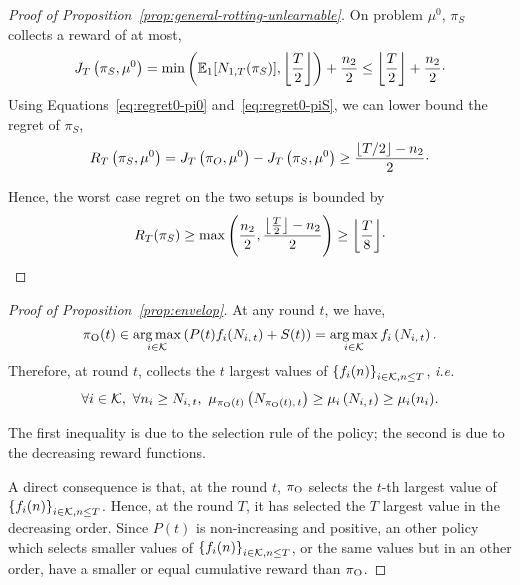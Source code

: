\begin{proof}[Proof of Proposition~\ref{prop:general-rotting-unlearnable}]
On problem $\mu^{0}$, $\pi_S$ collects a reward of at most,
\begin{equation}
\label{eq:regret0-piS}
    J_T\left(\pi_S, \mu^0\right) = \min\left(\mathbb{E}_1[N_{1,T}(\pi_S)],\left\lfloor\frac{T}{2}\right\rfloor\right) + \frac{n_2}{2} \leq \left\lfloor\frac{T}{2}\right\rfloor + \frac{n_2}{2}\cdot
\end{equation}
Using Equations~\ref{eq:regret0-pi0} and~\ref{eq:regret0-piS}, we can lower bound the regret of $\pi_S$, 
\[ R_T\left(\pi_S, \mu^0\right) = J_T\left(\pi_O, \mu^0\right) - J_T\left(\pi_S, \mu^0\right) \geq  \frac{\left\lfloor T/2\right\rfloor - n_2}{2}\cdot \]

Hence, the worst case regret on the two setups is bounded by 
\[R_T(\pi_S) \geq \max\left(\frac{n_2}{2}, \frac{\left\lfloor\frac{T}{2}\right\rfloor - n_2}{2}\right) \geq \left\lfloor\frac{T}{8}\right\rfloor\!\cdot \]
\end{proof}

\begin{proof}[Proof of Proposition~\ref{prop:envelop}]
At any round $t$, we have,
\[
\pi_{\rm O}(t) \in \operatorname*{arg\,max}_{i \in \mathcal{K}} \left(P(t)f_i(N_{i,\,t}) + S(t)\right) = \operatorname*{arg\,max}_{i \in \mathcal{K}} f_i \left(N_{i,\,t}\right).
\] 
Therefore, at round $t$, collects the $t$ largest values of $\left\{f_i(n)\right\}_{i\in \mathcal{K}, n\leq T}$, \textit{i.e.} 
\[
\forall i \in \mathcal{K}, \ \forall n_i \geq N_{i,\,t}, \ \mu_{\pi_{\rm O}(t)}\left(N_{\pi_{\rm O}(t),\,t}\right) \geq\mu_{i}\left(N_{i,\,t}\right)  \geq \mu_i(n_i).
\]

The first inequality is due to the selection rule of the policy; the second is due to the decreasing reward functions. 

A direct consequence is that, at the round $t$, $\pi_{\rm O}$ selects the $t$-th largest value of $\left\{f_i(n)\right\}_{i \in \mathcal{K}, n \leq T}$. Hence, at the round $T$, it has selected the $T$ largest value in the decreasing order. Since $P(t)$ is non-increasing and positive, an other policy which selects smaller values of $\left\{f_i(n)\right\}_{i \in \mathcal{K}, n \leq T}$, or the same values but in an other order, have a smaller or equal cumulative reward than $\pi_{\rm O}$.
\end{proof}
